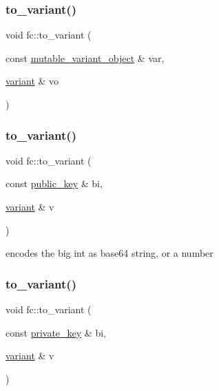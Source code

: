 \subsubsection{\texorpdfstring{to\+\_\+variant()}{to\_variant()}\hspace{0.1cm}{\footnotesize\ttfamily [3/8]}}
{\footnotesize\ttfamily void fc\+::to\+\_\+variant (\begin{DoxyParamCaption}\item[{const \mbox{\hyperlink{classfc_1_1mutable__variant__object}{mutable\+\_\+variant\+\_\+object}} \&}]{var,  }\item[{\mbox{\hyperlink{classfc_1_1variant}{variant}} \&}]{vo }\end{DoxyParamCaption})}

\mbox{\label{namespacefc_a25119a8943ec18e6a5b0e0f47b62a94c}} 
\subsubsection{\texorpdfstring{to\+\_\+variant()}{to\_variant()}\hspace{0.1cm}{\footnotesize\ttfamily [4/8]}}
{\footnotesize\ttfamily void fc\+::to\+\_\+variant (\begin{DoxyParamCaption}\item[{const \mbox{\hyperlink{classfc_1_1public__key}{public\+\_\+key}} \&}]{bi,  }\item[{\mbox{\hyperlink{classfc_1_1variant}{variant}} \&}]{v }\end{DoxyParamCaption})}

encodes the big int as base64 string, or a number \mbox{\label{namespacefc_a7e0370298d2b97fba3993cb772749c6a}} 
\subsubsection{\texorpdfstring{to\+\_\+variant()}{to\_variant()}\hspace{0.1cm}{\footnotesize\ttfamily [5/8]}}
{\footnotesize\ttfamily void fc\+::to\+\_\+variant (\begin{DoxyParamCaption}\item[{const \mbox{\hyperlink{classfc_1_1private__key}{private\+\_\+key}} \&}]{bi,  }\item[{\mbox{\hyperlink{classfc_1_1variant}{variant}} \&}]{v }\end{DoxyParamCaption})}

